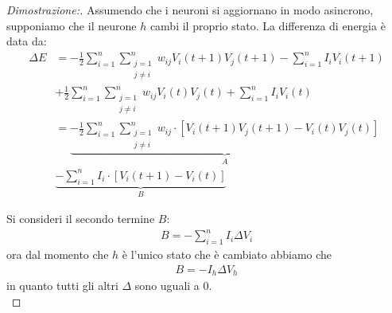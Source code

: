 \begin{proof}[Dimostrazione:]
    Assumendo che i neuroni si aggiornano in modo asincrono, supponiamo che il neurone $h$ cambi il proprio stato. La differenza di energia è data da:
    \begin{align*}
            \Delta E &= - \frac{1}{2} \sum_{i=1}^n \sum_{\substack{j=1 \\ j \neq i}}^n w_{ij} V_i(t + 1) V_j(t + 1) - \sum_{i=1}^n I_i V_i(t + 1) \\
            &+ \frac{1}{2} \sum_{i=1}^n \sum_{\substack{j=1 \\ j \neq i}}^n w_{ij} V_i(t) V_j(t) + \sum_{i=1}^n I_i V_i(t) \\
            &= \underbrace{- \frac{1}{2} \sum_{i=1}^n \sum_{\substack{j=1 \\ j \neq i}}^n w_{ij} \cdot [V_i(t + 1) V_j(t + 1) - V_i(t) V_j(t)]}_\textbf{$A$} \\
            & \underbrace{- \sum_{i=1}^n I_i \cdot [V_i(t + 1) - V_i(t)]}_\textbf{$B$}
    \end{align*}
    
    \newpage
    
    Si consideri il secondo termine $B$:
    \begin{align*}
        B = - \sum_{i=1}^n I_i \Delta V_i
    \end{align*}
    ora dal momento che $h$ è l'unico stato che è cambiato abbiamo che
    \begin{align*}
        B = - I_h \Delta V_h
    \end{align*}
    in quanto tutti gli altri $\Delta$ sono uguali a 0.\\
    

\end{proof}
